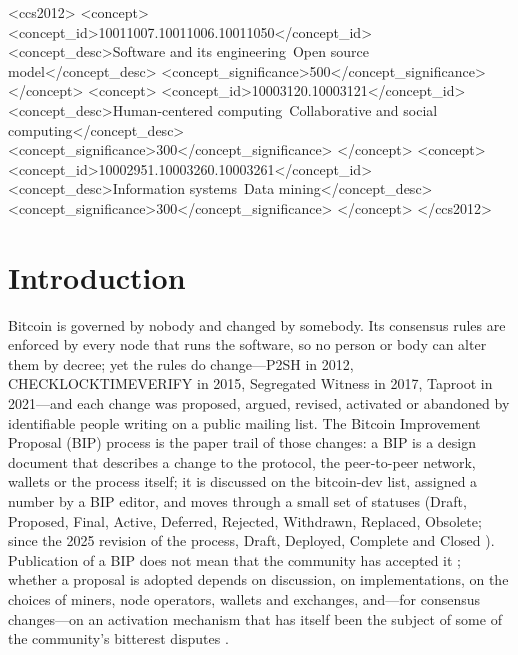 \documentclass[sigconf,screen]{acmart}
\begin{document}
\begin{CCSXML}
<ccs2012>
 <concept>
  <concept_id>10011007.10011006.10011050</concept_id>
  <concept_desc>Software and its engineering~Open source model</concept_desc>
  <concept_significance>500</concept_significance>
 </concept>
 <concept>
  <concept_id>10003120.10003121</concept_id>
  <concept_desc>Human-centered computing~Collaborative and social computing</concept_desc>
  <concept_significance>300</concept_significance>
 </concept>
 <concept>
  <concept_id>10002951.10003260.10003261</concept_id>
  <concept_desc>Information systems~Data mining</concept_desc>
  <concept_significance>300</concept_significance>
 </concept>
</ccs2012>
\end{CCSXML}



\maketitle

\section{Introduction}

Bitcoin is governed by nobody and changed by somebody. Its consensus rules are enforced by every node that runs the software, so no person or body can alter them by decree; yet the rules do change---P2SH in 2012, CHECKLOCKTIMEVERIFY in 2015, Segregated Witness in 2017, Taproot in 2021---and each change was proposed, argued, revised, activated or abandoned by identifiable people writing on a public mailing list. The Bitcoin Improvement Proposal (BIP) process \cite{bip2} is the paper trail of those changes: a BIP is a design document that describes a change to the protocol, the peer-to-peer network, wallets or the process itself; it is discussed on the bitcoin-dev list, assigned a number by a BIP editor, and moves through a small set of statuses (Draft, Proposed, Final, Active, Deferred, Rejected, Withdrawn, Replaced, Obsolete; since the 2025 revision of the process, Draft, Deployed, Complete and Closed \cite{bip2}). Publication of a BIP does not mean that the community has accepted it \cite{bitcoinbips}; whether a proposal is adopted depends on discussion, on implementations, on the choices of miners, node operators, wallets and exchanges, and---for consensus changes---on an activation mechanism that has itself been the subject of some of the community's bitterest disputes \cite{bip8, bip148}.
\end{document}
